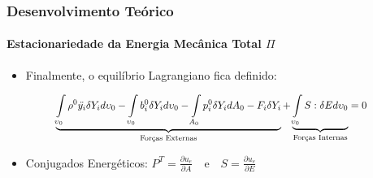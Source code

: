\documentclass{beamer}
\begin{document}
\begin{frame}
    \frametitle{Desenvolvimento Teórico}
        \framesubtitle{Estacionariedade da Energia Mecânica Total $\varPi$} 

        
        \begin{itemize}
            \item Finalmente, o equilíbrio Lagrangiano fica definido:
        \end{itemize}

        \begin{equation}
            \scalebox{0.9}{$
            \underbrace{
            \int\limits_{\upsilon_0}\rho^0\ddot{y_i}\delta Y_i d\upsilon_0 
            - \int\limits_{\upsilon_0}b_i^0\delta Y_i d\upsilon_0 
            - \int\limits_{A_0}p_i^0\delta Y_i dA_0 - F_i\delta Y_i
            }_{\text{Forças Externas}}
            + \underbrace{
            \int\limits_{\upsilon_0}S : \delta E d\upsilon_0
            }_{\text{Forças Internas}} = 0
            $}
        \end{equation}

        \begin{itemize}
            \item Conjugados Energéticos: \( P^T = \frac{\partial u_e}{\partial A} \quad \text{e} \quad S = \frac{\partial u_e}{\partial E} \)
        \end{itemize}
\end{frame}
\end{document}
